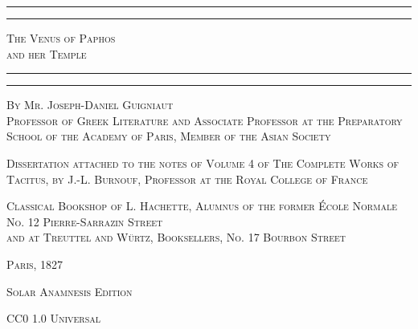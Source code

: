 \documentclass[a4paper, 11pt, oneside, polutonikogreek, english]{article}
\begin{document}
\begin{titlepage} %
	\centering %

	
	\rule{\textwidth}{1.6pt}\vspace*{-\baselineskip}\vspace*{2pt} %
	\rule{\textwidth}{0.4pt} %
	
	{\scshape\LARGE The Venus of Paphos \\ and her Temple}
	
	\rule{\textwidth}{0.4pt}\vspace*{-\baselineskip}\vspace{3.2pt} %
	\rule{\textwidth}{1.6pt} %

	
	\vspace{1\baselineskip}
	
	{\scshape By \large Mr. Joseph-Daniel Guigniaut \\\footnotesize Professor of Greek Literature and Associate Professor at the Preparatory School of the Academy of Paris, Member of the Asian Society} %

        \vspace{1\baselineskip}

        {\scshape\scriptsize Dissertation attached to the notes of Volume 4 of The Complete Works of Tacitus, by J.-L. Burnouf, Professor at the Royal College of France}
	
	
    \vspace*{\fill}

	\vspace{1\baselineskip}

	{\footnotesize\scshape Classical Bookshop of L. Hachette, Alumnus of the former École Normale \\ No. 12 Pierre-Sarrazin Street \\ and at Treuttel and Würtz, Booksellers, No. 17 Bourbon Street}
	
	{\scshape{Paris, 1827}}
	
	\vspace{0.5\baselineskip} %

    \scshape Solar Anamnesis Edition  %
	
	{\scshape\small CC0 1.0 Universal} %
\end{titlepage}
\end{document}
